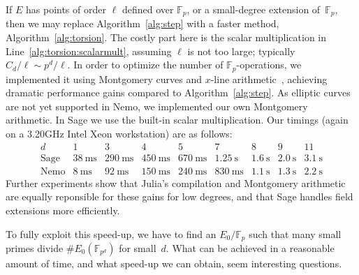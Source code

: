\documentclass[12pt]{article}
\newcommand{\F}{\mathbb{F}}
\newcommand{\FF}{\F}
\newcommand{\ms}{\mathrm{\ ms}}
\newcommand{\s}{\mathrm{\ s}}
\begin{document}
If $E$ has points of order $\ell$
defined over \(\FF_p\), or a small-degree extension of~\(\FF_p\),
then we may replace Algorithm~\ref{alg:step}
with a faster method, Algorithm~\ref{alg:torsion}.
The costly part here is the scalar multiplication in
Line~\ref{alg:torsion:scalarmult}, assuming $\ell$ is not too large;
typically \(C_d/\ell\sim p^d/\ell\).
In order to optimize the number of $\F_p$-operations, we implemented it
using Montgomery curves and \(x\)-line arithmetic~\cite{Montgomery}, 
achieving dramatic performance gains compared to
Algorithm~\ref{alg:step}.
As elliptic curves are not yet supported in Nemo, we implemented our own Montgomery arithmetic. In Sage we use the built-in scalar multiplication. 
Our timings (again on a 3.20GHz Intel Xeon workstation) are as follows:
\[
    \begin{array}{c|c|c|c|c|c|c|c|c}
        d & 1 & 3 & 4 & 5 & 7 & 8 & 9 & 11\\
        \hline
        \text{Sage} & 38 \ms & 290 \ms & 450 \ms & 670 \ms & 1.25 \s & 1.6 \s & 2.0 \s & 3.1  \s \\
        \hline
        \text{Nemo} & 8 \ms & 92 \ms & 150 \ms & 240 \ms & 830 \ms & 1.1 \s & 1.3 \s & 2.2 \s 
    \end{array}
\]
Further experiments show that Julia's compilation and Montgomery arithmetic are equally reponsible for these gains for low degrees, and that Sage handles field extensions more efficiently.

To fully exploit this speed-up, we have to find an \(E_0/\F_p\)
such that many small primes divide \(\#E_0(\FF_{p^d})\) for small~\(d\). 
What can be achieved in a reasonable amount of time, and what speed-up we can obtain, seem interesting questions. 
\end{document}

